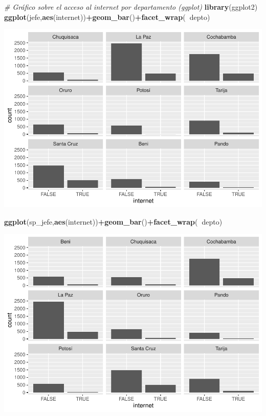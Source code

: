 \documentclass[
]{article}
\newenvironment{Shaded}{\begin{snugshade}}{\end{snugshade}}
\newcommand{\CommentTok}[1]{\textcolor[rgb]{0.56,0.35,0.01}{\textit{#1}}}
\newcommand{\KeywordTok}[1]{\textcolor[rgb]{0.13,0.29,0.53}{\textbf{#1}}}
\newcommand{\NormalTok}[1]{#1}
\newcommand{\OperatorTok}[1]{\textcolor[rgb]{0.81,0.36,0.00}{\textbf{#1}}}
\begin{document}
\begin{Shaded}
\begin{Highlighting}[]
\CommentTok{# Gráfico sobre el acceso al internet por departamento (ggplot)}
\KeywordTok{library}\NormalTok{(ggplot2)}
\KeywordTok{ggplot}\NormalTok{(jefe,}\KeywordTok{aes}\NormalTok{(internet))}\OperatorTok{+}\KeywordTok{geom_bar}\NormalTok{()}\OperatorTok{+}\KeywordTok{facet_wrap}\NormalTok{(}\OperatorTok{~}\NormalTok{depto)}
\end{Highlighting}
\end{Shaded}

\includegraphics{Parcial_2_sol_files/figure-latex/unnamed-chunk-5-1.pdf}

\begin{Shaded}
\begin{Highlighting}[]
\KeywordTok{ggplot}\NormalTok{(sp_jefe,}\KeywordTok{aes}\NormalTok{(internet))}\OperatorTok{+}\KeywordTok{geom_bar}\NormalTok{()}\OperatorTok{+}\KeywordTok{facet_wrap}\NormalTok{(}\OperatorTok{~}\NormalTok{depto)}
\end{Highlighting}
\end{Shaded}

\includegraphics{Parcial_2_sol_files/figure-latex/unnamed-chunk-5-2.pdf}
\end{document}
